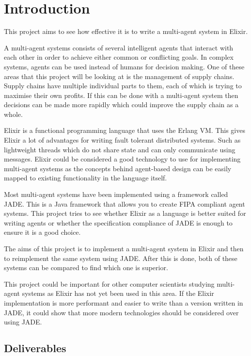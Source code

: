 \section{Introduction}

This project aims to see how effective it is to write a multi-agent system in Elixir.

A multi-agent systems consists of several intelligent agents that interact with each other in order to achieve either common or conflicting goals.
In complex systems, agents can be used instead of humans for decision making.
One of these areas that this project will be looking at is the management of supply chains.
Supply chains have multiple individual parts to them, each of which is trying to maximise their own profits.
If this can be done with a multi-agent system then decisions can be made more rapidly which could improve the supply chain as a whole.

Elixir is a functional programming language that uses the Erlang VM\@.
This gives Elixir a lot of advantages for writing fault tolerant distributed systems.
Such as lightweight threads which do not share state and can only communicate using messages.
Elixir could be considered a good technology to use for implementing multi-agent systems as the concepts behind agent-based design can be easily mapped to existing functionality in the language itself.

Most multi-agent systems have been implemented using a framework called JADE\@.
This is a Java framework that allows you to create FIPA compliant agent systems.
This project tries to see whether Elixir as a language is better suited for writing agents or whether the specification compliance of JADE is enough to ensure it is a good choice.

The aims of this project is to implement a multi-agent system in Elixir and then to reimplement the same system using JADE\@.
After this is done, both of these systems can be compared to find which one is superior.

This project could be important for other computer scientists studying multi-agent systems as Elixir has not yet been used in this area.
If the Elixir implementation is more performant and easier to write than a version written in JADE, it could show that more modern technologies should be considered over using JADE\@.

\subsection{Deliverables}

